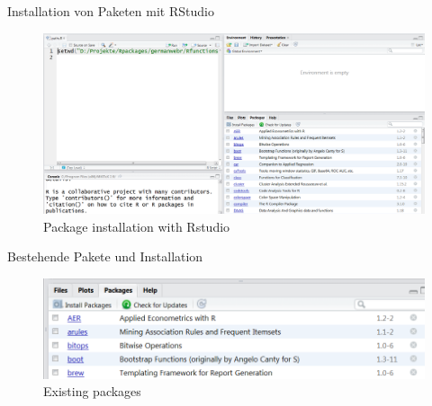 \documentclass[ignorenonframetext,]{beamer}
\begin{document}
\begin{frame}{Installation von Paketen mit RStudio}

\begin{figure}
\centering
\includegraphics{figure/PaketeRstudio.PNG}
\caption{Package installation with Rstudio}
\end{figure}

\end{frame}

\begin{frame}{Bestehende Pakete und Installation}

\begin{figure}
\centering
\includegraphics{figure/packages3.PNG}
\caption{Existing packages}
\end{figure}

\end{frame}
\end{document}
